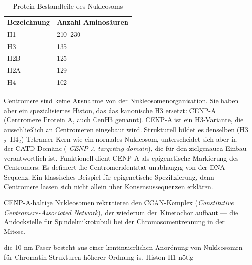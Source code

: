 \begin{table}[H]
    \centering
    \begin{tabular}{ll}
        \textbf{Bezeichnung} & \textbf{Anzahl Aminosäuren} \\
        H1                   & 210--230                    \\
        H3                   & 135                         \\
        H2B                  & 125                         \\
        H2A                  & 129                         \\
        H4                   & 102
    \end{tabular}
    \caption{Protein-Bestandteile des Nukleosoms}\label{tab:table2}
\end{table}


Centromere sind keine Ausnahme von der Nukleosomenorganisation.
Sie haben aber ein spezialisiertes Histon, das das
kanonische H3 ersetzt: CENP-A (Centromere Protein A, auch CenH3 genannt).
CENP-A ist ein H3-Variante, die ausschließlich an Centromeren eingebaut wird.
Strukturell bildet es denselben (H3
$_2$–H4$_2$)-Tetramer-Kern wie ein normales Nukleosom, unterscheidet sich aber in der CATD-Domäne (
\textit{CENP-A targeting domain}), die für den zielgenauen Einbau verantwortlich ist.
Funktionell dient CENP-A als epigenetische Markierung des Centromers: Es definiert die Centromeridentität unabhängig
von der DNA-Sequenz.
Ein klassisches Beispiel für epigenetische Spezifizierung, denn Centromere lassen sich nicht allein über
Konsensussequenzen erklären.

CENP-A-haltige Nukleosomen rekrutieren den CCAN-Komplex (\textit{Constitutive Centromere-Associated Network}), der wiederum den Kinetochor aufbaut — die Andockstelle für Spindelmikrotubuli bei der Chromosomentrennung in der Mitose.



die 10 nm-Faser besteht aus einer
kontinuierlichen Anordnung von
Nukleosomen
für Chromatin-Strukturen höherer Ordnung
ist Histon H1 nötig

